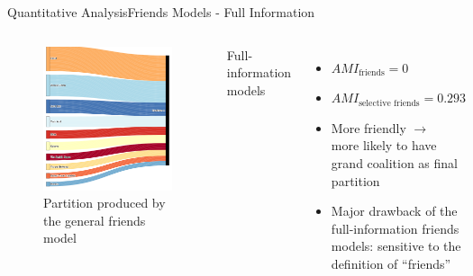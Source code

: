 \documentclass[xcolor=dvipsnames]{beamer}
\newcommand{\AMI}{\mathit{AMI}}
\begin{document}
\begin{frame}{Quantitative Analysis}{Friends Models - Full Information}
  \small
  \begin{columns}
  \begin{figure}
    \includegraphics[width=\linewidth]{friends}
    \caption[Partition visualization: general friends model]{Partition produced by the general friends model}
  \end{figure}
  Full-information models
  \begin{itemize}
    \item $\AMI_{\text{friends}} = 0$
    \item $\AMI_{\text{selective friends}} = 0.293$
    \item More friendly $\rightarrow$ more likely to have grand coalition as final partition
    \item Major drawback of the full-information friends models: sensitive to the definition of ``friends''
  \end{itemize}
  \end{columns}
\end{frame}
\end{document}
